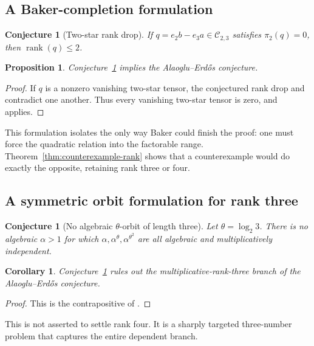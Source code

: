 \documentclass[11pt]{article}
\newtheorem{proposition}[theorem]{Proposition}
\newtheorem{corollary}[theorem]{Corollary}
\newtheorem{conjecture}[theorem]{Conjecture}
\theoremstyle{definition}
\theoremstyle{remark}
\newcommand{\rank}{\operatorname{rank}}
\begin{document}
\subsection{A Baker-completion formulation}

\begin{conjecture}[Two-star rank drop]
\label{conj:rank-drop}
If $q=e_2b-e_3a\in\mathcal C_{2,3}$ satisfies $\pi_2(q)=0$, then
$\rank(q)\le2$.
\end{conjecture}

\begin{proposition}
\label{prop:rank-drop-implies}
Conjecture~\ref{conj:rank-drop} implies the Alaoglu--Erd\H{o}s conjecture.
\end{proposition}

\begin{proof}
If $q$ is a nonzero vanishing two-star tensor, the conjectured rank drop and
 contradict one another.  Thus every vanishing two-star tensor is
zero, and  applies.
\end{proof}

This formulation isolates the only way Baker could finish the proof: one must force the
quadratic relation into the factorable range.  Theorem~\ref{thm:counterexample-rank} shows
that a counterexample would do exactly the opposite, retaining rank three or four.

\subsection{A symmetric orbit formulation for rank three}

\begin{conjecture}[No algebraic $\theta$-orbit of length three]
\label{conj:theta-orbit}
Let $\theta=\log_2 3$.  There is no algebraic $\alpha>1$ for which
$\alpha,\alpha^\theta,\alpha^{\theta^2}$ are all algebraic and multiplicatively independent.
\end{conjecture}

\begin{corollary}
Conjecture~\ref{conj:theta-orbit} rules out the multiplicative-rank-three branch of the
Alaoglu--Erd\H{o}s conjecture.
\end{corollary}

\begin{proof}
This is the contrapositive of .
\end{proof}

This is not asserted to settle rank four.  It is a sharply targeted three-number problem
that captures the entire dependent branch.
\end{document}
